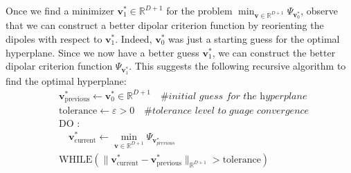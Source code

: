 \documentclass[12pt]{amsart}
\theoremstyle{definition}
\theoremstyle{plain}
\theoremstyle{remark}
\newcommand{\RR}{\mathbb{R}}
\newcommand{\eps}{\varepsilon}
\begin{document}
Once we find a minimizer $\mathbf{v}_1^\ast \in \RR^{D + 1}$ for the problem $\min_{\mathbf{v} \in \RR^{D + 1}} \Psi_{\mathbf{v}_0^\ast}$, observe that we can construct a better dipolar criterion function by reorienting the dipoles with respect to $\mathbf{v}_1^\ast$. Indeed, $\mathbf{v}_0^\ast$ was just a starting guess for the optimal hyperplane. Since we now have a better guess $\mathbf{v}_1^\ast$, we can construct the better dipolar criterion function $\Psi_{\mathbf{v}_1^\ast}$. This suggests the following recursive algorithm to find the optimal hyperplane:
\begin{align*}
&\mathbf{v}_{\text{previous}}^\ast \leftarrow \mathbf{v}_0^\ast \in \RR^{D + 1} \quad \textit{\# initial guess for the hyperplane} \\
&\text{tolerance} \leftarrow \eps > 0 \quad \textit{\# tolerance level to guage convergence} \\
&\text{DO }: \\
&\quad \mathbf{v}_{\text{current}}^\ast \leftarrow \min_{\mathbf{v} \in \RR^{D + 1}} \Psi_{\mathbf{v}_{previous}^\ast} \\
&\text{WHILE}(\|\mathbf{v}_{\text{current}}^\ast - \mathbf{v}_{\text{previous}}^\ast\|_{\RR^{D + 1}} > \text{tolerance})
\end{align*}







\end{document}
